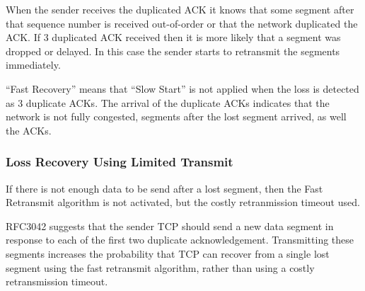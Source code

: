When the sender receives the duplicated ACK it knows that some
segment after that sequence number is received out-of-order or
that the network duplicated the ACK. If 3 duplicated ACK received
then it is more likely that a segment was dropped or delayed.
In this case the sender starts to retransmit the segments
immediately.

``Fast Recovery'' means that ``Slow Start'' is not applied
when the loss is detected as 3 duplicate ACKs. The arrival
of the duplicate ACKs indicates that the network is not fully
congested, segments after the lost segment arrived, as well
the ACKs.

%
%
%
%
%
%

\subsubsection*{Loss Recovery Using Limited Transmit}

If there is not enough data to be send after a lost segment,
then the Fast Retransmit algorithm is not activated, but the
costly retranmission timeout used.

RFC3042 suggests that the sender TCP should send a new data segment
in response to each of the first two duplicate acknowledgement. Transmitting
these segments increases the probability that TCP can recover from a single
lost segment using the fast retransmit algorithm, rather than using a costly
retransmission timeout.

